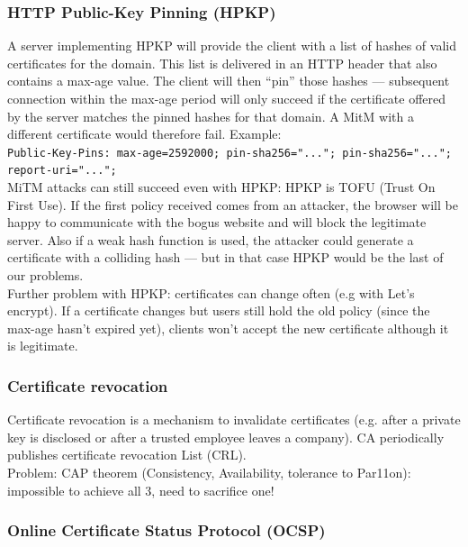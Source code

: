 \documentclass[11pt,oneside,a4paper]{article}
\begin{document}
\subsubsection{HTTP Public-Key Pinning (HPKP)}

A server implementing HPKP will provide the client with a list of hashes of valid
certificates for the domain. This list is delivered in an HTTP header that also contains a
max-age value. The client will then “pin” those hashes — subsequent connection within the
max-age period will only succeed if the certificate offered by the server matches the pinned
hashes for that domain. A MitM with a different certificate would therefore fail. Example:\\
\hspace*{5mm} \texttt{Public-Key-Pins: max-age=2592000; pin-sha256="..."; pin-sha256="...";\\
\hspace*{5mm} report-uri="...";\\
}
MiTM attacks can still succeed even with HPKP: HPKP is TOFU (Trust On First Use). If the first policy received comes from an
attacker, the browser will be happy to communicate with the bogus website and will block
the legitimate server. Also if a weak hash function is used, the attacker could generate a
certificate with a colliding hash — but in that case HPKP would be the last of our problems.\\

Further problem with HPKP: certificates can change often (e.g with Let's encrypt). If a certificate changes but users still hold the old policy (since the max-age hasn't expired yet), clients won't accept the new certificate although it is legitimate.

\newpage

\subsubsection{Certificate revocation}

Certificate revocation is a mechanism to invalidate certificates (e.g. after a private key is disclosed or after a trusted employee leaves a company). CA periodically publishes certificate revocation List (CRL).\\
Problem: CAP theorem (Consistency, Availability, tolerance to Par11on):
impossible to achieve all 3, need to sacrifice one!

\subsubsection{Online Certificate Status Protocol (OCSP)}
\end{document}
